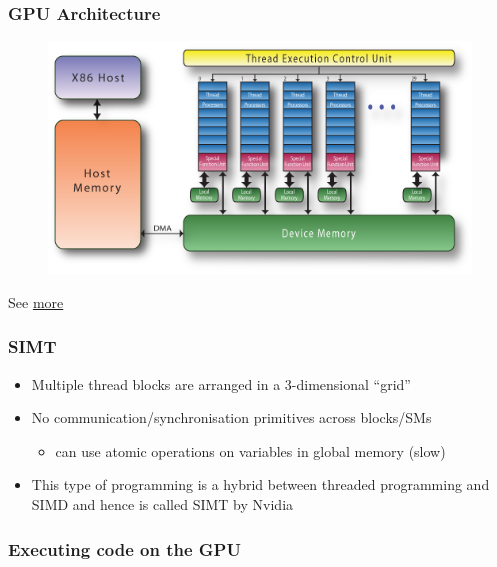 \subsubsection{GPU Architecture}\label{gpu-architecture}

\begin{figure}[htbp]
\centering
\includegraphics{09Accelerators/figures/pgi-nvidia-block-diagram.png}
\end{figure}

See
\href{http://www.gris.informatik.tu-darmstadt.de/cuda-workshop/tutorial/Advanced_CUDA_01.pdf}{more}

\subsubsection{SIMT}\label{simt}

\begin{itemize}
\itemsep1pt\parskip0pt
\item
  Multiple thread blocks are arranged in a 3-dimensional ``grid''
\item
  No communication/synchronisation primitives across blocks/SMs

  \begin{itemize}
  \itemsep1pt\parskip0pt
  \item
    can use atomic operations on variables in global memory (slow)
  \end{itemize}
\item
  This type of programming is a hybrid between threaded programming and
  SIMD and hence is called SIMT by Nvidia
\end{itemize}

\subsubsection{Executing code on the
GPU}\label{executing-code-on-the-gpu}

